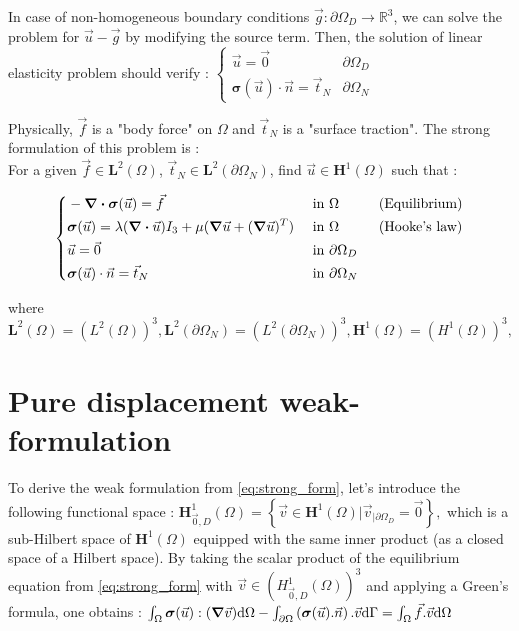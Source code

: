 \documentclass[a4paper,12pt,twoside]{report}
\newcommand{\mtr}{\mathbb{R}}
\newcommand{\dif}{\mathrm{d}}
\begin{document}
In case of non-homogeneous boundary conditions $\vec g : \partial \Omega_D \rightarrow \mtr^3$, we can solve the problem for $\vec u - \vec g$ by modifying the source term. Then, the solution of linear elasticity problem should verify :
$
\left\{ \begin{array}{ll}
\vec u = \vec 0 & \partial \Omega_D \\
\boldsymbol{\sigma} (\vec u) \cdot \vec n = \vec t_N & \partial \Omega_N
\end{array} \right.
$

Physically, $\vec f$ is a "body force" on $\Omega$ and $\vec t_N$ is a "surface traction". 
The strong formulation of this problem is : \\
For a given $\vec f \in \boldsymbol L^2(\Omega)$, $\vec t_N \in \boldsymbol L^2(\partial \Omega_N)$, find $\vec u \in \boldsymbol H^1(\Omega)$ such that : 

\begin{tcolorbox}
\begin{equation}
\label{eq:strong_form}
\left\{
\begin{aligned}
    & - \div \boldsymbol{\sigma} (\vec u) = \vec f & \text{ in } & \Omega \hspace{1cm} \text{(Equilibrium)}\\
    & \boldsymbol{\sigma} (\vec u) = \lambda (\div \vec u) I_3 + \mu (\grad \vec u + (\grad \vec u)^T) & \text{ in }& \Omega \hspace{1cm} \text{(Hooke's law)} \\
    & \vec u = \vec 0 & \text{ in } &\partial \Omega_D \\
    & \boldsymbol{\sigma} (\vec u) \cdot \vec n = \vec t_N & \text{ in }& \partial \Omega_N
\end{aligned}
\right.
\end{equation}
\end{tcolorbox}

where $\boldsymbol L^2(\Omega) = \left(L^2(\Omega) \right)^3, \boldsymbol L^2(\partial \Omega_N) = \left(L^2(\partial \Omega_N) \right)^3, \boldsymbol H^1(\Omega) = \left(H^1(\Omega) \right)^3, $

\section{Pure displacement weak-formulation} \label{sec:Pure displacement weak-formulation}

To derive the weak formulation from \eqref{eq:strong_form}, let's introduce the following functional space : $\boldsymbol H^1_{\vec 0,D}(\Omega) = \left\{ \vec v \in \boldsymbol H^1(\Omega) \Big| \vec v_{|\partial\Omega_D} = \vec 0 \right\},$
which is a sub-Hilbert space of $\boldsymbol H^1(\Omega)$ equipped with the same inner product (as a closed space of a Hilbert space). By taking the scalar product of the equilibrium equation from \eqref{eq:strong_form} with $\vec v \in \left(H^1_{\vec 0,D}(\Omega) \right)^3$ and applying a Green's formula, one obtains :
$\int_\Omega \boldsymbol{\sigma} (\vec u) : (\grad \vec v) \dif \Omega - \int_{\partial\Omega} \left(\boldsymbol{\sigma} (\vec u).\vec n \right).\vec v \dif \Gamma = \int_\Omega \vec f . \vec v \dif \Omega$
\end{document}
